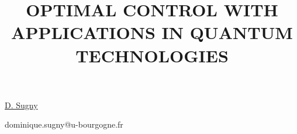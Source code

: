 \title{OPTIMAL CONTROL WITH APPLICATIONS IN QUANTUM TECHNOLOGIES}

\underline{D. Sugny}  



\email dominique.sugny@u-bourgogne.fr


\vspace{\baselineskip}